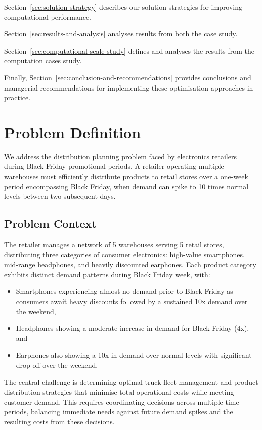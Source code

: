 \documentclass[a4paper,12pt]{article}
\begin{document}
Section~\ref{sec:solution-strategy} describes our solution strategies for improving computational performance.

Section~\ref{sec:results-and-analysis} analyses results from both the case study.

Section~\ref{sec:computational-scale-study} defines and analyses the results from the computation cases study.

Finally, Section~\ref{sec:conclusion-and-recommendations} provides conclusions and managerial recommendations for implementing these optimisation approaches in practice.





\section{Problem Definition}\label{sec:problem-definition}

We address the distribution planning problem faced by electronics retailers during Black Friday promotional periods.
A retailer operating multiple warehouses must efficiently distribute products to retail stores over a one-week period encompassing Black Friday, when demand can spike to 10 times normal levels between two subsequent days.

\subsection{Problem Context}\label{subsec:problem-context}

The retailer manages a network of 5 warehouses serving 5 retail stores, distributing three categories of consumer electronics: high-value smartphones, mid-range headphones, and heavily discounted earphones.
Each product category exhibits distinct demand patterns during Black Friday week, with:

\begin{itemize}
    \item Smartphones experiencing almost no demand prior to Black Friday as consumers await heavy discounts followed by a sustained 10x demand over the weekend,
    \item Headphones showing a moderate increase in demand for Black Friday (4x), and
    \item Earphones also showing a 10x in demand over normal levels with significant drop-off over the weekend.
\end{itemize}

The central challenge is determining optimal truck fleet management and product distribution strategies that minimise total operational costs while meeting customer demand.
This requires coordinating decisions across multiple time periods, balancing immediate needs against future demand spikes and the resulting costs from these decisions.
\end{document}
